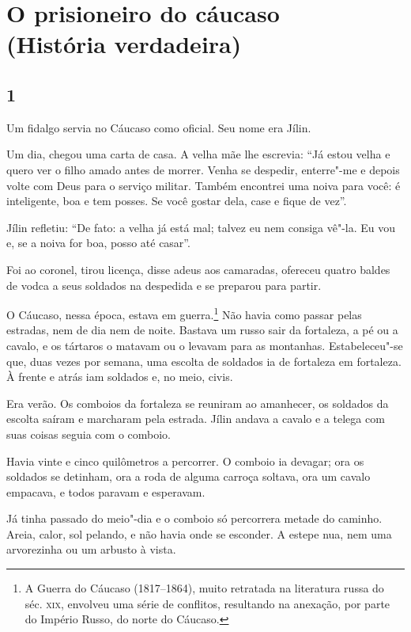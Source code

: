 \chapter{O prisioneiro do cáucaso\\ (História verdadeira)}

\section{1}

\noindent{}Um fidalgo servia no Cáucaso como oficial. Seu nome era Jílin.

Um dia, chegou uma carta de casa. A velha mãe lhe escrevia: ``Já estou
velha e quero ver o filho amado antes de morrer. Venha se despedir,
enterre"-me e depois volte com Deus para o serviço militar. Também
encontrei uma noiva para você: é inteligente, boa e tem posses. Se você
gostar dela, case e fique de vez''.

Jílin refletiu: ``De fato: a velha já está mal; talvez eu nem consiga
vê"-la. Eu vou e, se a noiva for boa, posso até casar''.

Foi ao coronel, tirou licença, disse adeus aos camaradas, ofereceu
quatro baldes de vodca a seus soldados na despedida e se preparou para
partir.

O Cáucaso, nessa época, estava em guerra.\footnote{A Guerra do Cáucaso
  (1817--1864), muito retratada na literatura russa do séc. \textsc{xix},
  envolveu uma série de conflitos, resultando na anexação, por parte do
  Império Russo, do norte do Cáucaso.} Não havia como passar pelas
estradas, nem de dia nem de noite. Bastava um russo sair da fortaleza, a
pé ou a cavalo, e os tártaros o matavam ou o levavam para as montanhas.
Estabeleceu"-se que, duas vezes por semana, uma escolta de soldados ia de
fortaleza em fortaleza. À frente e atrás iam soldados e, no meio, civis.

Era verão. Os comboios da fortaleza se reuniram ao amanhecer, os
soldados da escolta saíram e marcharam pela estrada. Jílin andava a
cavalo e a telega com suas coisas seguia com o comboio.

Havia vinte e cinco quilômetros a percorrer. O comboio ia devagar; ora
os soldados se detinham, ora a roda de alguma carroça soltava, ora um
cavalo empacava, e todos paravam e esperavam.

Já tinha passado do meio"-dia e o comboio só percorrera metade do
caminho. Areia, calor, sol pelando, e não havia onde se esconder. A
estepe nua, nem uma arvorezinha ou um arbusto à vista.

